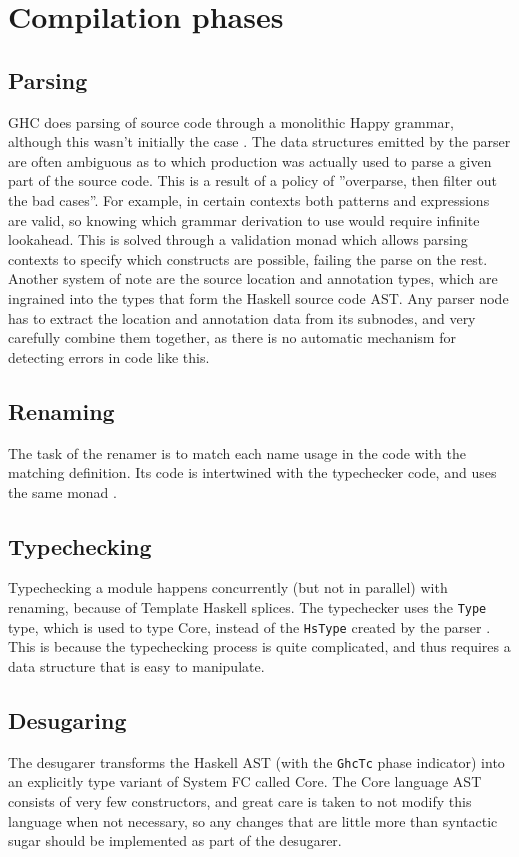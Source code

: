 \documentclass[en]{pracamgr}
\begin{document}
\section{Compilation phases}
\subsection{Parsing}
GHC does parsing of source code through a monolithic Happy grammar\cite{Happy}, although this wasn't initially the case \cite{Jones1993TheGH}.
The data structures emitted by the parser are often ambiguous as to which production was actually used to parse a given part of the source code.
This is a result of a policy of ''overparse, then filter out the bad cases''\cite{ParserWiki}.
For example, in certain contexts both patterns and expressions are valid, so knowing which grammar derivation to use would require infinite lookahead.
This is solved through a validation monad which allows parsing contexts to specify which constructs are possible, failing the parse on the rest.
Another system of note are the source location and annotation types, which are ingrained into the types that form the Haskell source code AST.
Any parser node has to extract the location and annotation data from its subnodes, and very carefully combine them together,
as there is no automatic mechanism for detecting errors in code like this.

\subsection{Renaming}
The task of the renamer is to match each name usage in the code with the matching definition. 
Its code is intertwined with the typechecker code, and uses the same monad \cite{RenamerWiki}.

\subsection{Typechecking}
Typechecking a module happens concurrently (but not in parallel) with renaming, because of Template Haskell splices.
The typechecker uses the \texttt{Type} type, which is used to type Core, instead of the \texttt{HsType} created by the parser \cite{TypecheckerWiki}.
This is because the typechecking process is quite complicated, and thus requires a data structure that is easy to manipulate.

\subsection{Desugaring}
The desugarer transforms the Haskell AST (with the \texttt{GhcTc} phase indicator) into an explicitly type variant of System FC called Core\cite{CoreWiki}.
The Core language AST consists of very few constructors, and great care is taken to not modify this language when not necessary, 
so any changes that are little more than syntactic sugar should be implemented as part of the desugarer.
\end{document}
